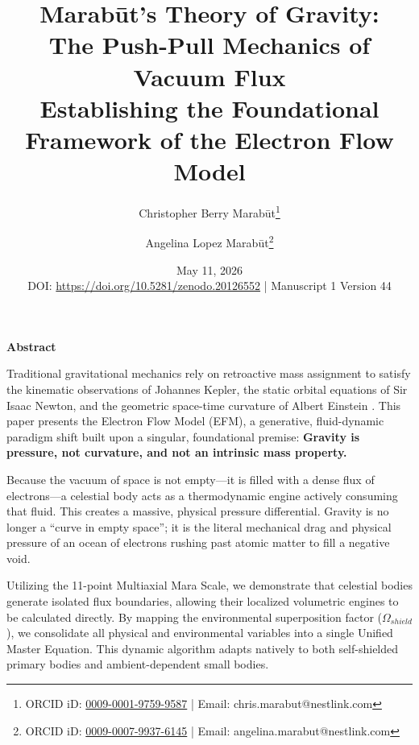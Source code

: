 \documentclass[11pt, a4paper]{article}
\title{\textbf{Marab\={u}t's Theory of Gravity: \\The Push-Pull Mechanics of Vacuum Flux} \\[1em] \large{Establishing the Foundational Framework of the Electron Flow Model}}
\author[1]{Christopher Berry Marab\={u}t\thanks{ORCID iD: \href{https://orcid.org/0009-0001-9759-9587}{0009-0001-9759-9587} | Email: chris.marabut@nestlink.com}}
\author[1]{Angelina Lopez Marab\={u}t\thanks{ORCID iD: \href{https://orcid.org/0009-0007-9937-6145}{0009-0007-9937-6145} | Email: angelina.marabut@nestlink.com}}
\affil[1]{Independent Researchers}
\date{May 11, 2026 \\[1.5em] \small{DOI: \url{https://doi.org/10.5281/zenodo.20126552} | Manuscript 1 Version 44}}
\begin{document}

\maketitle

\begingroup
  \small
  \begin{center}
    \textbf{Abstract}
  \end{center}
  \vspace{-0.5em}

  Traditional gravitational mechanics rely on retroactive mass assignment to satisfy the kinematic observations of Johannes Kepler, the static orbital equations of Sir Isaac Newton, and the geometric space-time curvature of Albert Einstein \cite{kepler1609, newton1687, einstein1915}. This paper presents the Electron Flow Model (EFM), a generative, fluid-dynamic paradigm shift built upon a singular, foundational premise: \textbf{Gravity is pressure, not curvature, and not an intrinsic mass property.} 

  Because the vacuum of space is not empty---it is filled with a dense flux of electrons---a celestial body acts as a thermodynamic engine actively consuming that fluid. This creates a massive, physical pressure differential. Gravity is no longer a ``curve in empty space''; it is the literal mechanical drag and physical pressure of an ocean of electrons rushing past atomic matter to fill a negative void.

  Utilizing the 11-point Multiaxial Mara Scale, we demonstrate that celestial bodies generate isolated flux boundaries, allowing their localized volumetric engines to be calculated directly. By mapping the environmental superposition factor ($\Omega_{shield}$), we consolidate all physical and environmental variables into a single Unified Master Equation. This dynamic algorithm adapts natively to both self-shielded primary bodies and ambient-dependent small bodies. 
  
\end{document}
